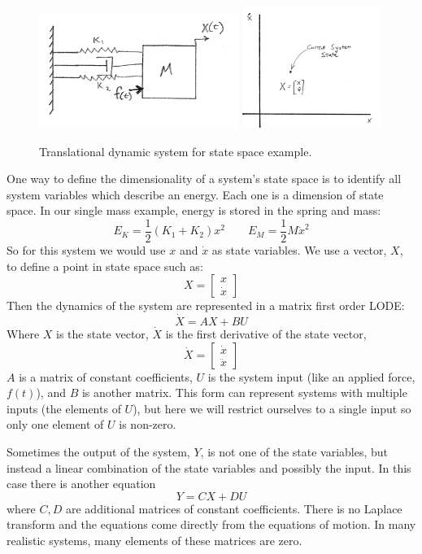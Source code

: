 \begin{figure}\centering
\includegraphics[width=65mm]{figs04/01069.png}   \hspace{0.25in}
\includegraphics[width=45mm]{figs04/01075.png}
\caption{Translational dynamic system for state space example.}\label{2Dstatespace}
\end{figure}

One way to define the dimensionality of a system's state space is to identify all system variables which describe an energy.  Each one is a dimension of state space.   In our single mass example, energy is stored in the spring and mass:
\[
E_K = \frac{1}{2}(K_1 + K_2)x^2 \qquad E_M = \frac{1}{2}M{\dot{x}}^2
\] 
So for this system we would use $x$ and $\dot{x}$ as state variables. 
We use a vector, $X$, to define a point in state space such as:
\[
X = \begin{bmatrix} x \\ \dot{x} \end{bmatrix}
\]
Then the dynamics of the system are represented in a matrix first order LODE:
\[
\dot{X} = AX+BU
\]
Where $X$ is the state vector, $\dot{X}$ is the first derivative of the state vector,
\[
\dot{X} = \begin{bmatrix}\dot{x} \\ \ddot{x} \end{bmatrix}
\]
$A$ is a matrix of constant coefficients, 
$U$ is the system input (like an applied force, $f(t)$), and 
$B$ is another matrix.  This form can represent systems with multiple inputs (the elements of $U$), but here we will restrict ourselves to a single input so only one element of $U$ is non-zero.

Sometimes the output of the system, $Y$, is not one of the state variables, but instead a linear
combination of the state variables and possibly the input.  In this case there is another equation 
\[
Y = CX+DU
\]
where $C,D$ are additional matrices of constant coefficients.   
There is no Laplace transform and the 
equations come directly from the equations of motion. In many realistic systems, 
many  elements of these matrices are zero. 



